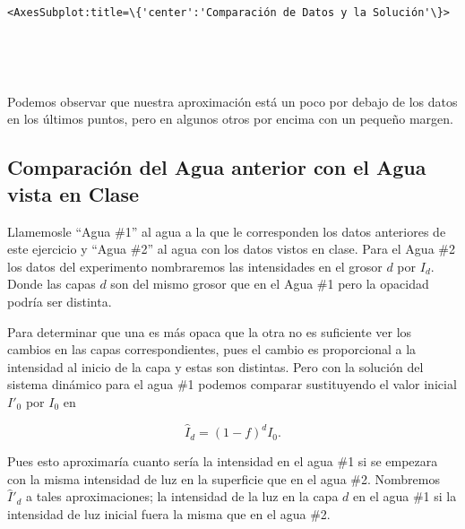 \documentclass[11pt]{article}
\begin{document}
    \begin{Verbatim}[commandchars=\\\{\}]
<AxesSubplot:title=\{'center':'Comparación de Datos y la Solución'\}>
    \end{Verbatim}

    
    \begin{center}
    \end{center}
    { \hspace*{\fill} \\}
    
    \begin{center}
    \end{center}
    { \hspace*{\fill} \\}
    
    Podemos observar que nuestra aproximación está un poco por debajo de los
datos en los últimos puntos, pero en algunos otros por encima con un
pequeño margen.

    \hypertarget{comparaciuxf3n-del-agua-anterior-con-el-agua-vista-en-clase}{%
\subsection*{Comparación del Agua anterior con el Agua vista en
Clase}\label{comparaciuxf3n-del-agua-anterior-con-el-agua-vista-en-clase}}

    Llamemosle ``Agua \#1'' al agua a la que le corresponden los datos
anteriores de este ejercicio y ``Agua \#2'' al agua con los datos vistos
en clase. Para el Agua \#2 los datos del experimento nombraremos las
intensidades en el grosor \(d\) por \(I_d\). Donde las capas \(d\) son
del mismo grosor que en el Agua \#1 pero la opacidad podría ser
distinta.

    Para determinar que una es más opaca que la otra no es suficiente ver
los cambios en las capas correspondientes, pues el cambio es
proporcional a la intensidad al inicio de la capa y estas son distintas.
Pero con la solución del sistema dinámico para el agua \#1 podemos
comparar sustituyendo el valor inicial \(I'_0\) por \(I_0\) en

\[\hat I_d = (1-f)^{d}I_0.\]

Pues esto aproximaría cuanto sería la intensidad en el agua \#1 si se
empezara con la misma intensidad de luz en la superficie que en el agua
\#2. Nombremos \(\hat I'_d\) a tales aproximaciones; la intensidad de la
luz en la capa \(d\) en el agua \#1 si la intensidad de luz inicial
fuera la misma que en el agua \#2.
\end{document}
